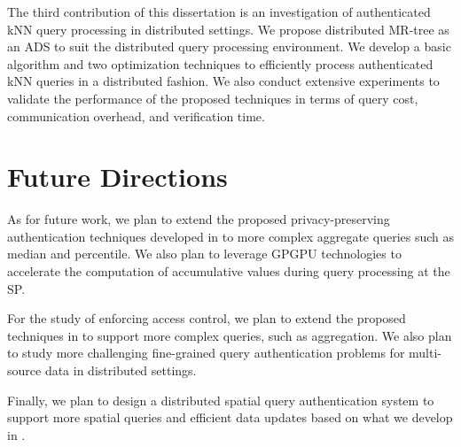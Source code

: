 The third contribution of this dissertation is an investigation of authenticated kNN query processing in distributed settings. We propose distributed MR-tree as an ADS to suit the distributed query processing environment. We develop a basic algorithm and two optimization techniques to efficiently process authenticated kNN queries in a distributed fashion. We also conduct extensive experiments to validate the performance of the proposed techniques in terms of query cost, communication overhead, and verification time.

\section{Future Directions}

As for future work, we plan to extend the proposed privacy-preserving authentication techniques developed in  to more complex aggregate queries such as median and percentile. We also plan to leverage GPGPU technologies to accelerate the computation of accumulative values during query processing at the SP\@.

For the study of enforcing access control, we plan to extend the proposed techniques in  to support more complex queries, such as aggregation. We also plan to study more challenging fine-grained query authentication problems for multi-source data in distributed settings.

Finally, we plan to design a distributed spatial query authentication system to support more spatial queries and efficient data updates based on what we develop in .
